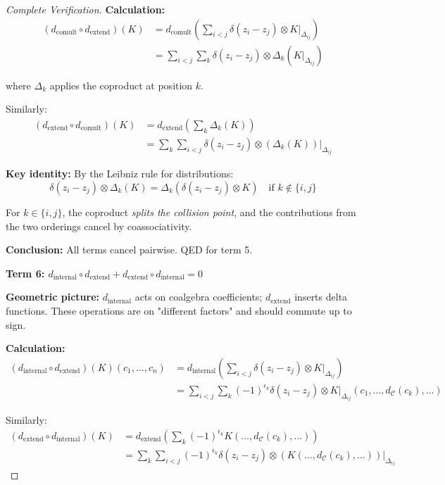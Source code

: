 \begin{proof}[Complete Verification]
\textbf{Calculation:}
\begin{align*}
(d_{\text{comult}} \circ d_{\text{extend}})(K) &= d_{\text{comult}}\left(\sum_{i<j} 
\delta(z_i - z_j) \otimes K|_{\Delta_{ij}}\right) \\
&= \sum_{i<j} \sum_k \delta(z_i - z_j) \otimes \Delta_k(K|_{\Delta_{ij}})
\end{align*}

where $\Delta_k$ applies the coproduct at position $k$.

Similarly:
\begin{align*}
(d_{\text{extend}} \circ d_{\text{comult}})(K) &= d_{\text{extend}}\left(\sum_k 
\Delta_k(K)\right) \\
&= \sum_k \sum_{i<j} \delta(z_i - z_j) \otimes (\Delta_k(K))|_{\Delta_{ij}}
\end{align*}

\textbf{Key identity:} By the Leibniz rule for distributions:
$$\delta(z_i - z_j) \otimes \Delta_k(K) = \Delta_k(\delta(z_i - z_j) \otimes K) 
\quad \text{if } k \notin \{i, j\}$$

For $k \in \{i,j\}$, the coproduct \emph{splits the collision point}, and the 
contributions from the two orderings cancel by coassociativity.

\textbf{Conclusion:} All terms cancel pairwise. QED for term 5.

\textbf{Term 6: $d_{\text{internal}} \circ d_{\text{extend}} + d_{\text{extend}} 
\circ d_{\text{internal}} = 0$}

\textbf{Geometric picture:} $d_{\text{internal}}$ acts on coalgebra coefficients; 
$d_{\text{extend}}$ inserts delta functions. These operations are on "different 
factors" and should commute up to sign.

\textbf{Calculation:}
\begin{align*}
(d_{\text{internal}} \circ d_{\text{extend}})(K)(c_1, \ldots, c_n) &= 
d_{\text{internal}}\left(\sum_{i<j} \delta(z_i - z_j) \otimes K|_{\Delta_{ij}}\right) \\
&= \sum_{i<j} \sum_k (-1)^{\epsilon_k} \delta(z_i - z_j) \otimes 
K|_{\Delta_{ij}}(c_1, \ldots, d_{\mathcal{C}}(c_k), \ldots)
\end{align*}

Similarly:
\begin{align*}
(d_{\text{extend}} \circ d_{\text{internal}})(K) &= d_{\text{extend}}\left(\sum_k 
(-1)^{\epsilon_k} K(\ldots, d_{\mathcal{C}}(c_k), \ldots)\right) \\
&= \sum_k \sum_{i<j} (-1)^{\epsilon_k} \delta(z_i - z_j) \otimes 
(K(\ldots, d_{\mathcal{C}}(c_k), \ldots))|_{\Delta_{ij}}
\end{align*}


\end{proof}
